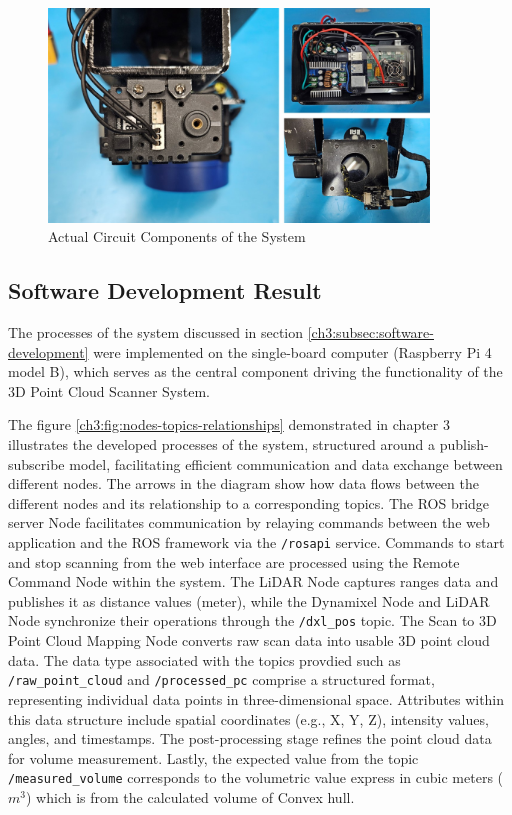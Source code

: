 \begin{figure}[H]
	\centering
	\includegraphics[width=0.9\textwidth]{Figures/actual-circuit-components}
	\caption{Actual Circuit Components of the System}
	\label{ch4:fig:circuit-diagram}
\end{figure}

\subsection{Software Development Result}

The processes of the system discussed in section \ref{ch3:subsec:software-development} were implemented on the single-board computer (Raspberry Pi 4 model B), which serves as the central component driving the functionality of the 3D Point Cloud Scanner System.

The figure \ref{ch3:fig:nodes-topics-relationships} demonstrated in chapter 3 illustrates the developed processes of the system, structured around a publish-subscribe model, facilitating efficient communication and data exchange between different nodes. The arrows in the diagram show how data flows between the different nodes and its relationship to a corresponding topics. The ROS bridge server Node facilitates communication by relaying commands between the web application and the ROS framework via the \texttt{/rosapi} service. Commands to start and stop scanning from the web interface are processed using the Remote Command Node within the system. The LiDAR Node captures ranges data and publishes it as distance values (meter), while the Dynamixel Node and LiDAR Node synchronize their operations through the \texttt{/dxl\_pos} topic. The Scan to 3D Point Cloud Mapping Node converts raw scan data into usable 3D point cloud data. The data type associated with the topics provdied such as \texttt{/raw\_point\_cloud} and \texttt{/processed\_pc} comprise a structured format, representing individual data points in three-dimensional space. Attributes within this data structure include spatial coordinates (e.g., X, Y, Z), intensity values, angles, and timestamps. The post-processing stage refines the point cloud data for volume measurement. Lastly, the expected value from the topic \texttt{/measured\_volume} corresponds to the volumetric value express in cubic meters ($m^3$) which is from the calculated volume of Convex hull.

